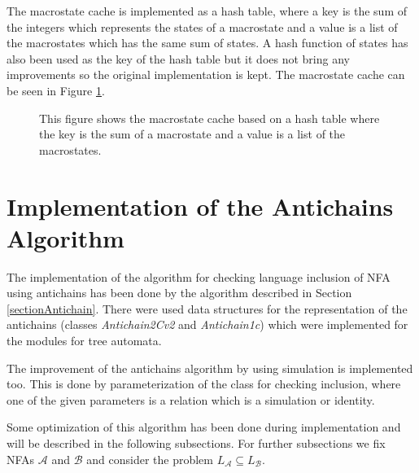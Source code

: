 The macrostate cache is implemented as a hash table, where a key is the sum of the integers which represents the states of a macrostate and a value is a
list of the macrostates which has the same sum of states. A hash function of states has also been used as the key of the hash table
but it does not bring any improvements so the original implementation is kept. %
The macrostate cache can be seen in Figure \ref{figMacroCache}.

\begin{figure}[bt]
\begin{center}
  
  \caption{This figure shows the macrostate cache based on a hash table where the key is the sum of a macrostate and a value is a list of the macrostates.}
  \label{figMacroCache}
\end{center}
\end{figure}

\section{Implementation of the Antichains Algorithm}
The implementation of the algorithm for checking language inclusion of NFA using antichains has been done by the algorithm described in Section 
\ref{sectionAntichain}.  There were used data structures for the representation of the antichains (classes \emph{Antichain2Cv2} and \emph{Antichain1c}) which
were implemented for the modules for tree automata. 

The improvement of the antichains algorithm by using simulation is implemented too. 
This is done by parameterization of the class for checking inclusion, where one of the given parameters is a relation which is a simulation or identity.

Some optimization of this algorithm has been done during implementation and will be described in the following subsections. For further subsections we fix
NFAs $\mathcal{A}$ and $\mathcal{B}$ and consider the problem $L_{\mathcal{A}}\subseteq L_{\mathcal{B}}$.

